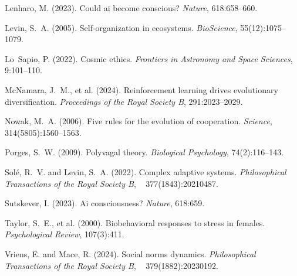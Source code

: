 \documentclass[12pt,openany]{book}
\begin{document}
\begin{thebibliography}{}
Lenharo, M. (2023).
\newblock Could ai become conscious?
\newblock \emph{Nature}, 618:658--660.

Levin, S.~A. (2005).
\newblock Self-organization in ecosystems.
\newblock \emph{BioScience}, 55(12):1075--1079.

Lo~Sapio, P. (2022).
\newblock Cosmic ethics.
\newblock \emph{Frontiers in Astronomy and Space Sciences}, 9:101--110.

McNamara, J.~M., et al. (2024).
\newblock Reinforcement learning drives evolutionary diversification.
\newblock \emph{Proceedings of the Royal Society B}, 291:2023--2029.

Nowak, M.~A. (2006).
\newblock Five rules for the evolution of cooperation.
\newblock \emph{Science}, 314(5805):1560--1563.

Porges, S.~W. (2009).
\newblock Polyvagal theory.
\newblock \emph{Biological Psychology}, 74(2):116--143.

Sol{\'e}, R.~V. and Levin, S.~A. (2022).
\newblock Complex adaptive systems.
\newblock \emph{Philosophical Transactions of the Royal Society B},
  377(1843):20210487.

Sutskever, I. (2023).
\newblock Ai consciousness?
\newblock \emph{Nature}, 618:659.

Taylor, S.~E., et al. (2000).
\newblock Biobehavioral responses to stress in females.
\newblock \emph{Psychological Review}, 107(3):411.

Vriens, E. and Mace, R. (2024).
\newblock Social norms dynamics.
\newblock \emph{Philosophical Transactions of the Royal Society B},
  379(1882):20230192.

\end{thebibliography}
\end{document}
